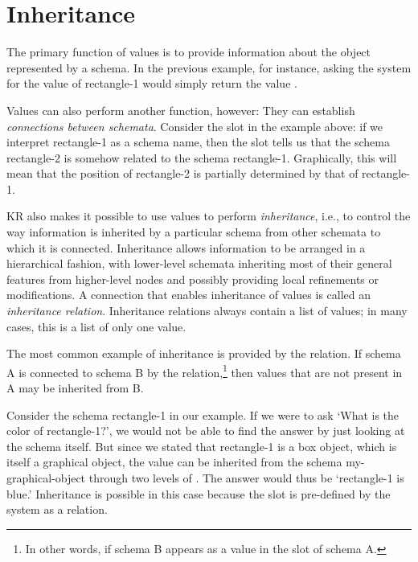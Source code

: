 \section{Inheritance}
\value{s-top}

The primary function of values is to provide information about the object
represented by a schema.  In the previous example, for instance, asking the
system for the  value of {\sc rectangle-1} would simply return the
value .

Values can also perform another function,
however: They can establish {\it connections between schemata}.
Consider the  slot in the example above: if we interpret
{\sc rectangle-1} as a schema name, then the slot tells us that the
schema {\sc rectangle-2} is somehow related to the schema
{\sc rectangle-1}.  Graphically, this will mean that the position of
{\sc rectangle-2} is partially determined by that of {\sc rectangle-1}.


KR also makes it possible to use values to perform {\it inheritance},
i.e., to control the way information is inherited by a
particular schema from other schemata to which it is connected.
Inheritance allows information to be arranged in a hierarchical fashion,
with lower-level schemata inheriting most of their general features from
higher-level nodes and possibly providing local refinements or
modifications.  A connection that enables inheritance of values is called an
{\it inheritance relation}.  Inheritance relations
always contain a list of values;  in many cases, this is a list of
only one value.

The most common example of inheritance is provided by the 
relation.  If schema A is connected to schema B by the
 relation,\footnote{In other words, if schema B appears as a value
in the  slot of schema A.} then values that are not present in A
may be inherited from B.

Consider the schema {\sc rectangle-1} in our example.  If we were to ask
`What is the color of {\sc rectangle-1}?', we would not be able to find the
answer by just looking at the schema itself.  But since we stated that
{\sc rectangle-1} is a box object, which is itself a graphical object,
the value can be inherited from the schema {\sc my-graphical-object}
through two levels of .  The answer would thus be
`{\sc rectangle-1} is blue.'  Inheritance is possible in this case because
the slot  is pre-defined by the system as a relation.





